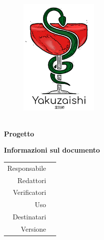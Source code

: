 \thispagestyle{empty}

\begin{figure}
	\centering
	\includegraphics[width=145px]{../template/images/logo}
\end{figure}

\hspace{2pt}

\begin{center}
	\textbf{\Large \documentName}\\[0.2cm]
	\textbf{\Large Progetto \projectName}
\end{center}

\vspace{2pt}

\begin{center}
	\groupEmail
\end{center}

\vspace{2pt}

\begin{center}
	\textbf{Informazioni sul documento}
\end{center}

\begin{table}[H]
	\centering
	\renewcommand{\arraystretch}{1.4}
	\begin{tabular}{r|l}
		Responsabile & \documentApprovers\vspace{2.5pt}\\
		Redattori & \documentEditors\vspace{2.5pt}\\
		Verificatori & \documentVerifiers\vspace{2.5pt}\\
		Uso & \documentUsage\vspace{2.5pt}\\
		Destinatari & \documentAddressee\vspace{2.5pt}\\
		Versione & \documentVersion\\
	\end{tabular}
\end{table}

